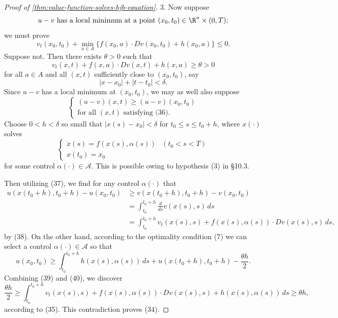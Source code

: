 \begin{proof}[Proof of \cref{thm:value-function-solves-hjb-equation}]
3. Now suppose
\[
u - v \text{ has a local minimum at a point } (x_0, t_0) \in \R^n \times (0, T);
\]
we must prove
\[
v_t(x_0, t_0) + \min_{a \in A} \{f(x_0, a) \cdot Dv(x_0, t_0) + h(x_0, a)\} \le 0.
\tag{34}
\]
Suppose not. Then there exists $\theta > 0$ such that
\[
v_t(x, t) + f(x, a) \cdot Dv(x, t) + h(x, a) \ge \theta > 0
\tag{35}
\]
for all $a \in A$ and all $(x, t)$ sufficiently close to $(x_0, t_0)$, say
\[
|x - x_0| + |t - t_0| < \delta.
\tag{36}
\]
Since $u - v$ has a local minimum at $(x_0, t_0)$, we may as well also suppose
\[
\begin{cases} (u - v)(x, t) \ge (u - v)(x_0, t_0) \\ \text{for all } (x, t) \text{ satisfying (36).} \end{cases}
\tag{37}
\]
Choose $0 < h < \delta$ so small that $|x(s) - x_0| < \delta$ for $t_0 \le s \le t_0 + h$, where $x(\cdot)$ solves
\[
\begin{cases} \dot{x}(s) = f(x(s), \alpha(s)) & (t_0 < s < T) \\ x(t_0) = x_0 \end{cases}
\tag{38}
\]
for some control $\alpha(\cdot) \in \mathcal{A}$. This is possible owing to hypothesis (3) in \S10.3.

Then utilizing (37), we find for any control $\alpha(\cdot)$ that
\[
\begin{aligned}
u(x(t_0 + h), t_0 + h) - u(x_0, t_0) &\ge v(x(t_0 + h), t_0 + h) - v(x_0, t_0) \\
&= \int_{t_0}^{t_0+h} \frac{d}{ds} v(x(s), s) \, ds \\
&= \int_{t_0}^{t_0+h} v_t(x(s), s) + f(x(s), \alpha(s)) \cdot Dv(x(s), s) \, ds,
\end{aligned}
\tag{39}
\]
by (38). On the other hand, according to the optimality condition (7) we can select a control $\alpha(\cdot) \in \mathcal{A}$ so that
\[
u(x_0, t_0) \geq \int_{t_0}^{t_0+h} h(x(s), \alpha(s)) \, ds + u(x(t_0+h), t_0+h) - \frac{\theta h}{2}.
\tag{40}
\]
Combining (39) and (40), we discover
\[
\frac{\theta h}{2} \geq \int_{t_0}^{t_0+h} v_t(x(s), s) + f(x(s), \alpha(s)) \cdot Dv(x(s), s) + h(x(s), \alpha(s)) \, ds \geq \theta h,
\]
according to (35). This contradiction proves (34).
\end{proof}


